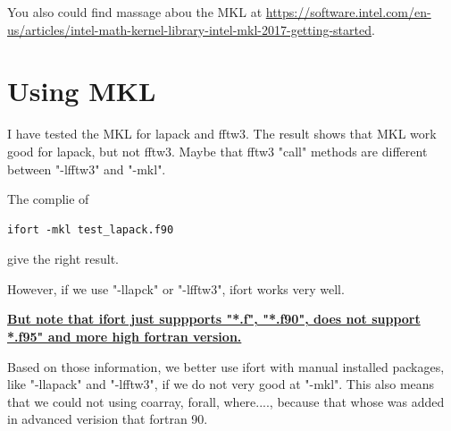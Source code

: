 You also could find massage abou the MKL at \url{https://software.intel.com/en-us/articles/intel-math-kernel-library-intel-mkl-2017-getting-started}.

\section{Using MKL}

I have tested the MKL for lapack and fftw3. The result shows that MKL work good for lapack, but not fftw3. Maybe that fftw3 "call" methods are different between "-lfftw3" and "-mkl".

The complie of 
\begin{verbatim}
ifort -mkl test_lapack.f90 
\end{verbatim}
give the right result.

However, if we use "-llapck" or "-lfftw3", ifort works very well. 

\underline{\textbf{But note that ifort  just suppports "*.f", "*.f90", does not support *.f95" and more high fortran version.}}

Based on those information, we better use ifort with manual installed packages, like "-llapack" and "-lfftw3", if we do not very good at "-mkl". This also means that we could not using coarray, forall, where...., because that whose was added in advanced verision that fortran 90.
 
 

